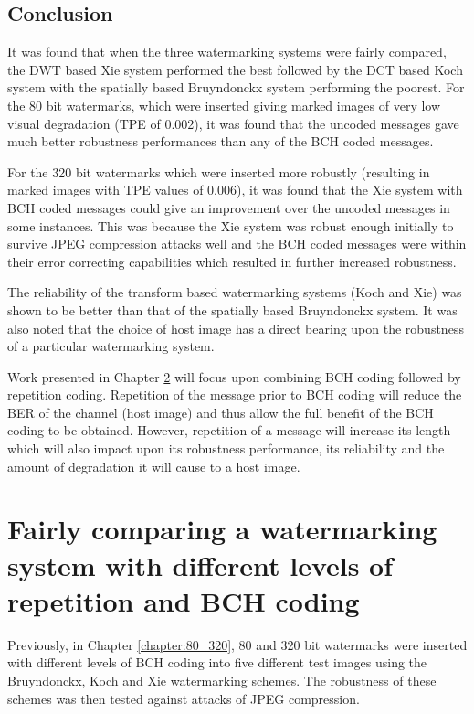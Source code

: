 \documentclass[12pt]{report}
\begin{document}
\section{Conclusion}
It was found that when the three watermarking systems were fairly compared, the DWT based Xie system performed the
best followed by the DCT based Koch system with the spatially based Bruyndonckx system performing the
poorest. For the 80 bit watermarks, which were inserted giving marked images of very low visual degradation (TPE of 0.002),
it was found that the uncoded messages gave much better robustness performances than any of the BCH coded messages.

For the 320 bit watermarks which were inserted more robustly (resulting in marked images with TPE values of 0.006),
it was found that the Xie system with BCH coded messages could give an improvement over the uncoded
messages in some instances. This was because the Xie system was robust enough initially to survive
JPEG compression attacks well and the BCH coded messages were within their error correcting capabilities which 
resulted in further increased robustness. 

The reliability of the transform based watermarking systems (Koch and Xie) was shown to be better than that 
of the spatially based Bruyndonckx system. It was also noted that the choice of host image has a direct bearing
upon the robustness of a particular watermarking system.

Work presented in Chapter
\ref{chapter:BK} 
will focus upon combining BCH coding followed by repetition coding. Repetition of the message prior
to BCH coding will reduce the BER of the channel (host image) and thus allow the full benefit of the BCH coding
to be obtained. However, repetition of a message will increase its length which will
also impact upon its robustness performance, its reliability and the amount of degradation it will cause to a host image.












\chapter{Fairly comparing a watermarking system with different levels of repetition and BCH coding}
\label{chapter:BK}
Previously, in Chapter \ref{chapter:80_320}, 80 and 320 bit 
watermarks were inserted with different levels of BCH coding into five different test
images using the Bruyndonckx, Koch and Xie watermarking schemes. The robustness of these schemes was then tested against
attacks of JPEG compression. 
\end{document}
